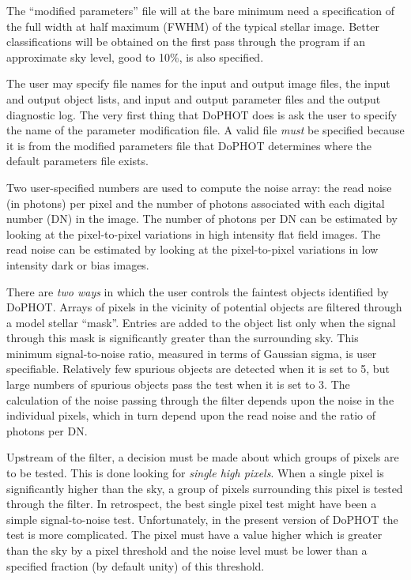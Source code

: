{The ``modified parameters'' file will at the bare minimum need a
specification of the full width at half maximum (FWHM) of
the typical stellar image.  Better classifications will be
obtained on the first pass through the program if an
approximate sky level, good to 10\%, is also specified.

The user may specify file names for the input and output
image files, the input and output object lists, and input
and output parameter files and the output diagnostic log.
The very first thing that DoPHOT does is ask the user to
specify the name of the parameter modification file.  A valid file
{\it must} be specified because it is from the modified parameters file
that DoPHOT determines where the default parameters file exists.

Two user-specified numbers are used to compute the noise
array: the read noise (in photons) per pixel and the number
of photons associated with each digital number (DN) in the
image.  The number of photons per DN can be estimated by
looking at the pixel-to-pixel variations in high intensity
flat field images.  The read noise can be estimated by
looking at the pixel-to-pixel variations in low intensity
dark or bias images.

There are {\it two ways} in which the user controls the
faintest objects identified by DoPHOT.  Arrays of pixels in
the vicinity of potential objects are filtered through a
model stellar ``mask''.  Entries are added to the object list
only when the signal through this mask is significantly
greater than the surrounding sky.  This minimum
signal-to-noise ratio, measured in terms of Gaussian sigma,
is user specifiable.  Relatively few spurious objects are
detected when it is set to 5, but large numbers of spurious
objects pass the test when it is set to 3.  The calculation
of the noise passing through the filter depends upon the
noise in the individual pixels, which in turn depend upon
the read noise and the ratio of photons per DN.

Upstream of the filter, a decision must be made about which
groups of pixels are to be tested.  This is done looking for
{\it single high pixels}.  When a single pixel is
significantly higher than the sky, a group of pixels
surrounding this pixel is tested through the filter.  In
retrospect, the best single pixel test might have been a
simple signal-to-noise test.  Unfortunately, in the
present version of DoPHOT the test is more complicated.  The
pixel must have a value higher which is greater than the sky
by a pixel threshold and the noise level must be lower
than a specified fraction (by default unity) of this
threshold.

}
